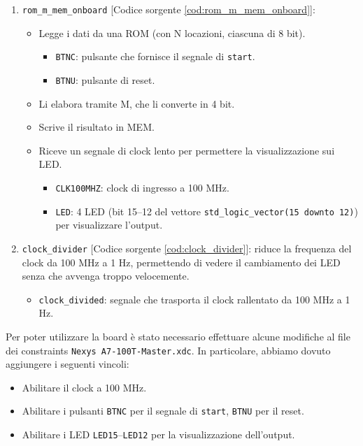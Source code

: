\begin{enumerate}
    \item \texttt{rom\_m\_mem\_onboard} [Codice sorgente \ref{cod:rom_m_mem_onboard}]:
    \begin{itemize}
        \item Legge i dati da una ROM (con N locazioni, ciascuna di 8 bit).
        \begin{itemize}
            \item \texttt{BTNC}: pulsante che fornisce il segnale di \texttt{start}.
            \item \texttt{BTNU}: pulsante di reset.
        \end{itemize}
        \item Li elabora tramite M, che li converte in 4 bit.
        \item Scrive il risultato in MEM.
        \item Riceve un segnale di clock lento per permettere la visualizzazione sui LED.
        \begin{itemize}
            \item \texttt{CLK100MHZ}: clock di ingresso a 100 MHz.
            \item \texttt{LED}: 4 LED (bit 15--12 del vettore \texttt{std\_logic\_vector(15 downto 12)}) per visualizzare l’output.
        \end{itemize}
    \end{itemize}
    \item \texttt{clock\_divider} [Codice sorgente \ref{cod:clock_divider}]: riduce la frequenza del clock da 100 MHz a 1 Hz, permettendo di vedere il cambiamento dei LED senza che avvenga troppo velocemente.
    \begin{itemize}
        \item \texttt{clock\_divided}: segnale che trasporta il clock rallentato da 100 MHz a 1 Hz.
    \end{itemize}
\end{enumerate}

Per poter utilizzare la board è stato necessario effettuare alcune modifiche al file dei constraints \texttt{Nexys A7-100T-Master.xdc}. In particolare, abbiamo dovuto aggiungere i seguenti vincoli:
\begin{itemize}
    \item Abilitare il clock a 100 MHz.
    \item Abilitare i pulsanti \texttt{BTNC} per il segnale di \texttt{start}, \texttt{BTNU} per il reset.
    \item Abilitare i LED \texttt{LED15}--\texttt{LED12} per la visualizzazione dell’output.
\end{itemize}

